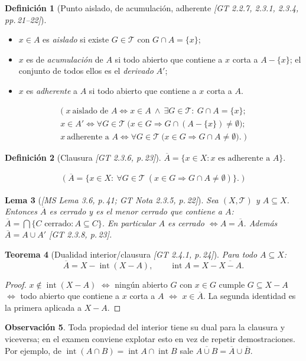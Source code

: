 \documentclass[11pt,a4paper]{article}
\newenvironment{lista}{\leavevmode\begin{itemize}[leftmargin=1.5em,itemsep=1pt,topsep=2pt,parsep=0pt]}{\end{itemize}}
\newcommand{\lgc}[1]{\par\vspace{-3pt}\begin{gather*}\big(\;#1\;\big)\end{gather*}\vspace{-6pt}}
\theoremstyle{definition}
\newtheorem{definicion}{Definición}[section]
\newtheorem{observacion}[definicion]{Observación}
\theoremstyle{plain}
\newtheorem{teorema}[definicion]{Teorema}
\newtheorem{lema}[definicion]{Lema}
\newcommand{\fnt}[1]{{\normalfont\small\itshape\color{gray!150!black}[#1]}}
\newcommand{\cl}[1]{\overline{#1}}
\newcommand{\intr}{\operatorname{int}}
\newcommand{\tp}{\mathcal{T}}
\begin{document}
\begin{definicion}[Punto aislado, de acumulación, adherente \fnt{GT 2.2.7, 2.3.1, 2.3.4, pp.\,21--22}]
\begin{lista}
\item $x\in A$ es \emph{aislado} si existe $G\in\tp$ con $G\cap A=\{x\}$;
\item $x$ es de \emph{acumulación} de $A$ si todo abierto que contiene a $x$ corta a $A-\{x\}$; el conjunto de todos ellos es el \emph{derivado} $A'$;
\item $x$ es \emph{adherente} a $A$ si todo abierto que contiene a $x$ corta a $A$.
\end{lista}
\lgc{x\ \text{aislado de } A\iff x\in A\ \wedge\ \exists G\in\tp:\ G\cap A=\{x\};\\
x\in A'\iff \forall G\in\tp\ \big(x\in G\Rightarrow G\cap(A-\{x\})\ne\emptyset\big);\\
x\ \text{adherente a } A\iff \forall G\in\tp\ \big(x\in G\Rightarrow G\cap A\ne\emptyset\big).}
\end{definicion}

\begin{definicion}[Clausura \fnt{GT 2.3.6, p.\,23}]
$\cl{A}=\{x\in X: x \text{ es adherente a } A\}$.
\lgc{\cl A=\{x\in X:\ \forall G\in\tp\ (x\in G\Rightarrow G\cap A\ne\emptyset)\}.}
\end{definicion}

\begin{lema}[\fnt{MS Lema 3.6, p.\,41; GT Nota 2.3.5, p.\,22}]
Sea $(X,\tp)$ y $A\subseteq X$. Entonces $\cl A$ es cerrado y es el \emph{menor} cerrado que contiene a $A$: $\cl A=\bigcap\{C \text{ cerrado}: A\subseteq C\}$. En particular $A$ es cerrado $\iff A=\cl A$. Además $\cl A=A\cup A'$ \fnt{GT 2.3.8, p.\,23}.
\end{lema}

\begin{teorema}[Dualidad interior/clausura \fnt{GT 2.4.1, p.\,24}]
Para todo $A\subseteq X$:
\[
\cl{A}=X-\intr(X-A),\qquad \intr A = X-\cl{X-A}.
\]
\end{teorema}

\begin{proof}
$x\notin\intr(X-A)$ $\iff$ ningún abierto $G$ con $x\in G$ cumple $G\subseteq X-A$ $\iff$ todo abierto que contiene a $x$ corta a $A$ $\iff$ $x\in\cl A$. La segunda identidad es la primera aplicada a $X-A$.
\end{proof}

\begin{observacion}
Toda propiedad del interior tiene su dual para la clausura y viceversa; en el examen conviene explotar esto en vez de repetir demostraciones. Por ejemplo, de $\intr(A\cap B)=\intr A\cap\intr B$ sale $\cl{A\cup B}=\cl A\cup\cl B$.
\end{observacion}
\end{document}
